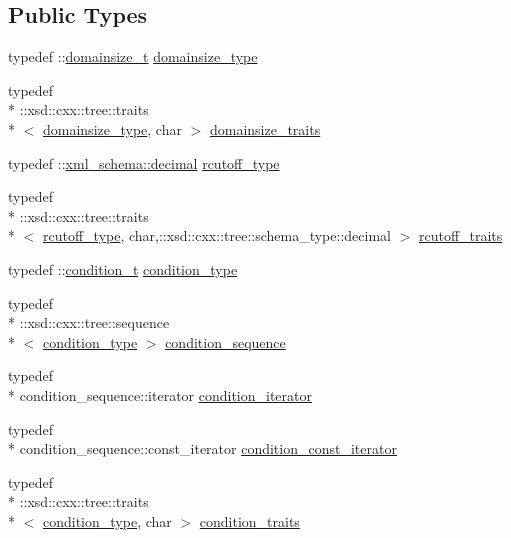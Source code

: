 \subsection*{Public Types}
\begin{DoxyCompactItemize}
\item 
typedef \-::\hyperlink{classdomainsize__t}{domainsize\-\_\-t} \hyperlink{classlc__t_a14e4ab30758da00bc9f186b0ef06a97e}{domainsize\-\_\-type}
\item 
typedef \\*
\-::xsd\-::cxx\-::tree\-::traits\\*
$<$ \hyperlink{classlc__t_a14e4ab30758da00bc9f186b0ef06a97e}{domainsize\-\_\-type}, char $>$ \hyperlink{classlc__t_af080ee9e8205b4e027f18eaa42a8bdfa}{domainsize\-\_\-traits}
\item 
typedef \-::\hyperlink{namespacexml__schema_a69bfaf24f63a8c18ebd8e21db6b343df}{xml\-\_\-schema\-::decimal} \hyperlink{classlc__t_aeee50e2ac6fe42996cb39a92ad78883e}{rcutoff\-\_\-type}
\item 
typedef \\*
\-::xsd\-::cxx\-::tree\-::traits\\*
$<$ \hyperlink{classlc__t_aeee50e2ac6fe42996cb39a92ad78883e}{rcutoff\-\_\-type}, char,\-::xsd\-::cxx\-::tree\-::schema\-\_\-type\-::decimal $>$ \hyperlink{classlc__t_a0e4c76efd7229ca57c957d12422c9ebc}{rcutoff\-\_\-traits}
\item 
typedef \-::\hyperlink{classcondition__t}{condition\-\_\-t} \hyperlink{classlc__t_aeb4f39b796939efd5541331610d5e28e}{condition\-\_\-type}
\item 
typedef \\*
\-::xsd\-::cxx\-::tree\-::sequence\\*
$<$ \hyperlink{classlc__t_aeb4f39b796939efd5541331610d5e28e}{condition\-\_\-type} $>$ \hyperlink{classlc__t_a0ee6b40c23baf2237388873de0c9df3f}{condition\-\_\-sequence}
\item 
typedef \\*
condition\-\_\-sequence\-::iterator \hyperlink{classlc__t_a2cd4737a0b7e2c244e6ec8ab87d99c1f}{condition\-\_\-iterator}
\item 
typedef \\*
condition\-\_\-sequence\-::const\-\_\-iterator \hyperlink{classlc__t_a8cd4fbfb140695f669c9ce89e8755f50}{condition\-\_\-const\-\_\-iterator}
\item 
typedef \\*
\-::xsd\-::cxx\-::tree\-::traits\\*
$<$ \hyperlink{classlc__t_aeb4f39b796939efd5541331610d5e28e}{condition\-\_\-type}, char $>$ \hyperlink{classlc__t_a484a730347d961f1270bdd8d61bbcda2}{condition\-\_\-traits}
\end{DoxyCompactItemize}
